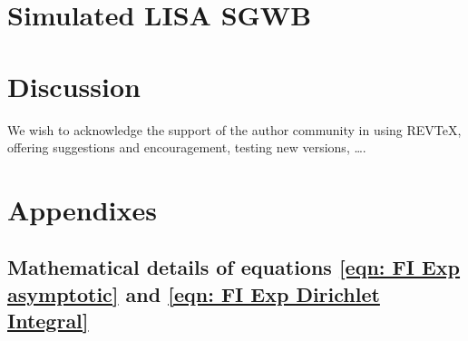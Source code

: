 \documentclass[%
 reprint,
 amsmath,amssymb,
 aps,
]{revtex4-2}
\begin{document}
\section{\label{sec:LISA} Simulated LISA SGWB}

\section{\label{sec:discussion} Discussion}



\begin{acknowledgments}
We wish to acknowledge the support of the author community in using
REV\TeX{}, offering suggestions and encouragement, testing new versions,
\dots.
\end{acknowledgments}

\appendix
\section{Appendixes}
\subsection{Mathematical details of equations \eqref{eqn: FI Exp asymptotic} and \eqref{eqn: FI Exp Dirichlet Integral}}
\label{subsec: maths details of the FI Exp example}
\end{document}
